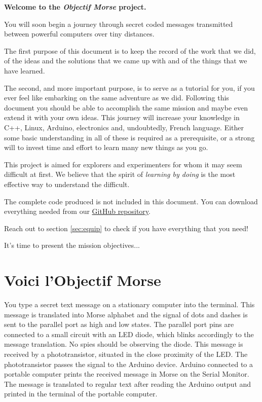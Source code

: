 \documentclass[10pt]{report}
\begin{document}
\textbf{Welcome to the \textit{Objectif Morse} project.}

You will soon begin a journey through secret coded messages transmitted between powerful computers over tiny distances.

The first purpose of this document is to keep the record of the work that we did, of the ideas and the solutions that we came up with and of the things that we have learned.

The second, and more important purpose, is to serve as a tutorial for you, if you ever feel like embarking on the same adventure as we did. Following this document you should be able to accomplish the same mission and maybe even extend it with your own ideas. This journey will increase your knowledge in C++, Linux, Arduino, electronics and, undoubtedly, French language. Either some basic understanding in all of these is required as a prerequisite, or a strong will to invest time and effort to learn many new things as you go.

This project is aimed for explorers and experimenters for whom it may seem difficult at first. We believe that the spirit of \textit{learning by doing} is the most effective way to understand the difficult.

The complete code produced is not included in this document. You can download everything needed from our \href{https://github.com/camillejr/objectif-morse}{GitHub repository}.

Reach out to section \ref{sec:equip} to check if you have everything that you need!

It's time to present the mission objectives...

\section{Voici l'Objectif Morse}

You type a secret text message on a stationary computer into the terminal. This message is translated into Morse alphabet and the signal of dots and dashes is sent to the parallel port as high and low states. The parallel port pins are connected to a small circuit with an LED diode, which blinks accordingly to the message translation. No spies should be observing the diode. This message is received by a phototransistor, situated in the close proximity of the LED. The phototransistor passes the signal to the Arduino device. Arduino connected to a portable computer prints the received message in Morse on the Serial Monitor. The message is translated to regular text after reading the Arduino output and printed in the terminal of the portable computer. 
\end{document}
